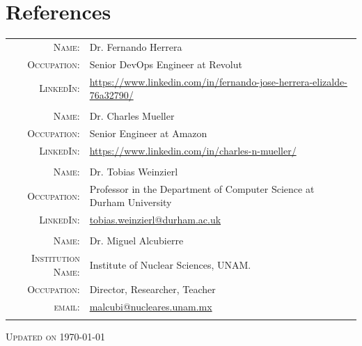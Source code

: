 \documentclass[a4paper,10pt]{article} %
\begin{document}
\section{References}
\bigskip
\begin{tabular}{rl}
	\textsc{Name:} & Dr. Fernando Herrera \\
	\textsc{Occupation:} & Senior DevOps Engineer at Revolut\\
	\textsc{LinkedIn:} & \href{https://www.linkedin.com/in/fernando-jose-herrera-elizalde-76a32790/}{https://www.linkedin.com/in/fernando-jose-herrera-elizalde-76a32790/}\\
	\multicolumn{2}{c}{} \\
	\textsc{Name:} & Dr. Charles Mueller\\
	\textsc{Occupation:} & Senior Engineer at Amazon\\
	\textsc{LinkedIn:} & \href{https://www.linkedin.com/in/charles-n-mueller/}{https://www.linkedin.com/in/charles-n-mueller/}\\
	\multicolumn{2}{c}{} \\
	\textsc{Name:} & Dr. Tobias Weinzierl\\
	\textsc{Occupation:} & Professor in the Department of Computer Science at Durham University\\
	\textsc{LinkedIn:} & \href{tobias.weinzierl@durham.ac.uk }{tobias.weinzierl@durham.ac.uk }\\
	\multicolumn{2}{c}{} \\
	\textsc{Name:} & Dr. Miguel Alcubierre \\
	\textsc{Institution Name:} & Institute of Nuclear Sciences, UNAM.\\
	\textsc{Occupation:} & Director, Researcher, Teacher\\
	\textsc{email:} & \href{mailto:malcubi@nucleares.unam.mx}{malcubi@nucleares.unam.mx}\\
	\multicolumn{2}{c}{} \\
\end{tabular}
\vspace{0cm}
\begin{center}
	\textsc{Updated on \today}
\end{center}
\end{document}
